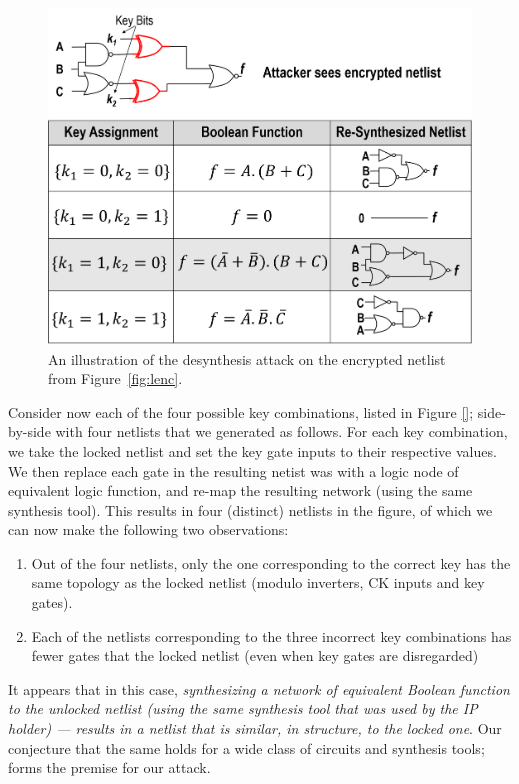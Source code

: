 \begin{figure}%
\centering
\includegraphics[width=0.9\columnwidth]{./figs/desynth.png}
\caption{An illustration of the desynthesis attack on the encrypted netlist from Figure~\ref{fig:lenc}. 
}
\label{fig:desynth}
\end{figure}

Consider now each of the four possible key combinations, listed in Figure \ref{}; side-by-side with four netlists that we generated as follows. For each key combination, we take the locked netlist and set the key gate inputs to their respective values. We then replace each gate in the resulting netist was with a logic node of equivalent logic function, and re-map the resulting network (using the same synthesis tool). This results in four (distinct) netlists in the figure, of which we can now make the following two observations:

\begin{enumerate}
    \item Out of the four netlists, only the one corresponding to the correct key has the same topology as the locked netlist (modulo inverters, CK inputs and key gates).
    \item Each of the netlists corresponding to the three incorrect key combinations has fewer gates that the locked netlist (even when key gates are disregarded)
\end{enumerate}

It appears that in this case, \emph{synthesizing a network of equivalent Boolean function to the unlocked netlist (using the same synthesis tool that was used by the IP holder) --- results in a netlist that is similar, \emph{in structure}, to the locked one}. Our conjecture that the same holds for a wide class of circuits and synthesis tools; forms the premise for our attack.

